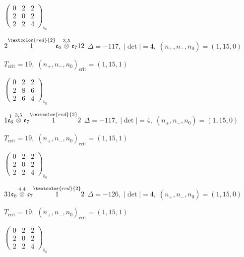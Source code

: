 \documentclass[10pt]{article}
\begin{document}
\hspace{2em}$\left(\begin{smallmatrix}0 & 2 & 2 \\ 2 & 0 & 2 \\ 2 & 2 & 4\end{smallmatrix}\right)_{\!b_0}$

$2\overset{\textcolor{red}{2}}{1}\mathfrak{e}_6\overset{3,5}{\otimes}\mathfrak{e}_712$ \quad $\Delta=-117,\; |\det|=4,\; (n_+,n_-,n_0)=(1,15,0)$

\hspace{1em}$T_{\text{crit}}=19,\; (n_+,n_-,n_0)_{\text{crit}}=(1,15,1)$

\hspace{2em}$\left(\begin{smallmatrix}0 & 2 & 2 \\ 2 & 8 & 6 \\ 2 & 6 & 4\end{smallmatrix}\right)_{\!b_0}$

\smallskip

$1\overset{1}{\mathfrak{e}_6}\overset{3,5}{\otimes}\mathfrak{e}_7\overset{\textcolor{red}{2}}{1}2$ \quad $\Delta=-117,\; |\det|=4,\; (n_+,n_-,n_0)=(1,15,0)$

\hspace{1em}$T_{\text{crit}}=19,\; (n_+,n_-,n_0)_{\text{crit}}=(1,15,1)$

\hspace{2em}$\left(\begin{smallmatrix}0 & 2 & 2 \\ 2 & 0 & 2 \\ 2 & 2 & 4\end{smallmatrix}\right)_{\!b_0}$

\smallskip

$31\mathfrak{e}_6\overset{4,4}{\otimes}\mathfrak{e}_7\overset{\textcolor{red}{2}}{1}2$ \quad $\Delta=-126,\; |\det|=4,\; (n_+,n_-,n_0)=(1,15,0)$

\hspace{1em}$T_{\text{crit}}=19,\; (n_+,n_-,n_0)_{\text{crit}}=(1,15,1)$

\hspace{2em}$\left(\begin{smallmatrix}0 & 2 & 2 \\ 2 & 0 & 2 \\ 2 & 2 & 4\end{smallmatrix}\right)_{\!b_0}$
\end{document}
